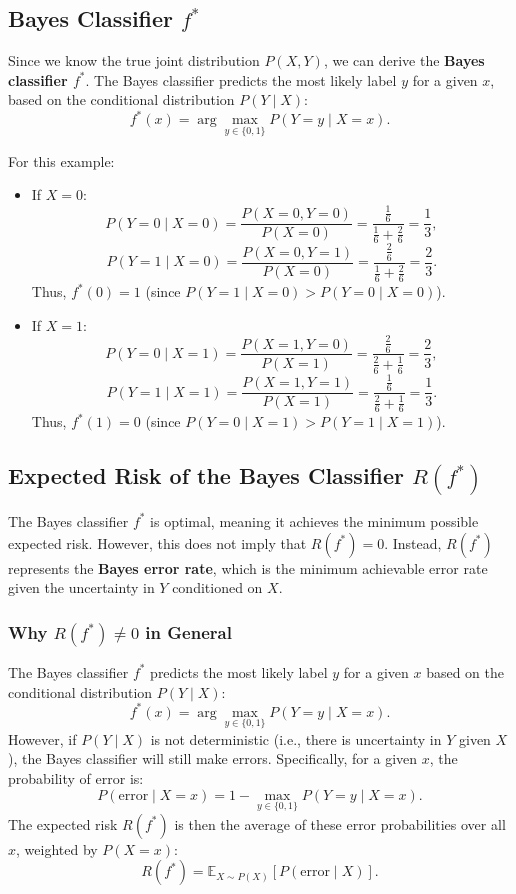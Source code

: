 \begin{notechapter}
\subsection{Bayes Classifier \( f^* \)}
Since we know the true joint distribution \( P(X, Y) \), we can derive the
\textbf{Bayes classifier \( f^* \)}. The Bayes classifier predicts the most likely label \( y \) for a given \( x \), based on the conditional distribution \( P(Y \mid X) \):
\[
f^*(x) = \arg\max_{y \in \{0,1\}} P(Y = y \mid X = x).
\]

For this example:
\begin{itemize}
    \item If \( X = 0 \):
      \[
      P(Y = 0 \mid X = 0) = \frac{P(X = 0, Y = 0)}{P(X = 0)} = \frac{\frac{1}{6}}{\frac{1}{6} + \frac{2}{6}} = \frac{1}{3},
      \]
      \[
      P(Y = 1 \mid X = 0) = \frac{P(X = 0, Y = 1)}{P(X = 0)} = \frac{\frac{2}{6}}{\frac{1}{6} + \frac{2}{6}} = \frac{2}{3}.
      \]
      Thus, \( f^*(0) = 1 \) (since \( P(Y = 1 \mid X = 0) > P(Y = 0 \mid X = 0) \)).

    \item If \( X = 1 \):
      \[
      P(Y = 0 \mid X = 1) = \frac{P(X = 1, Y = 0)}{P(X = 1)} = \frac{\frac{2}{6}}{\frac{2}{6} + \frac{1}{6}} = \frac{2}{3},
      \]
      \[
      P(Y = 1 \mid X = 1) = \frac{P(X = 1, Y = 1)}{P(X = 1)} = \frac{\frac{1}{6}}{\frac{2}{6} + \frac{1}{6}} = \frac{1}{3}.
      \]
      Thus, \( f^*(1) = 0 \) (since \( P(Y = 0 \mid X = 1) > P(Y = 1 \mid X = 1) \)).
\end{itemize}

\subsection{Expected Risk of the Bayes Classifier \( R(f^*) \)}
The Bayes classifier \( f^* \) is optimal, meaning it achieves the minimum possible expected risk. However, this does not imply that \( R(f^*) = 0 \). Instead, \( R(f^*) \) represents the \textbf{Bayes error rate}, which is the minimum achievable error rate given the uncertainty in \( Y \) conditioned on \( X \).

\subsubsection{Why \( R(f^*) \neq 0 \) in General}
The Bayes classifier \( f^* \) predicts the most likely label \( y \) for a given \( x \) based on the conditional distribution \( P(Y \mid X) \):
\[
f^*(x) = \arg\max_{y \in \{0,1\}} P(Y = y \mid X = x).
\]
However, if \( P(Y \mid X) \) is not deterministic (i.e., there is uncertainty in \( Y \) given \( X \)), the Bayes classifier will still make errors. Specifically, for a given \( x \), the probability of error is:
\[
P(\text{error} \mid X = x) = 1 - \max_{y \in \{0,1\}} P(Y = y \mid X = x).
\]
The expected risk \( R(f^*) \) is then the average of these error probabilities over all \( x \), weighted by \( P(X = x) \):
\[
R(f^*) = \mathbb{E}_{X \sim P(X)}[P(\text{error} \mid X)].
\]


\end{notechapter}
